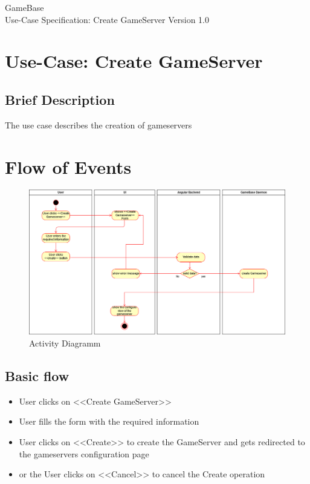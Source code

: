 \documentclass[a4paper,12pt,chapterprefix=false,bibliography=totoc,listof=totoc,book]{scrreprt}
\begin{document}
\begin{flushright}
GameBase
\\
Use-Case Specification: Create GameServer
\bigbreak
Version 1.0
\end{flushright}

\tableofcontents

\chapter{Use-Case: Create GameServer}

\section{Brief Description}
The use case describes the creation of gameservers

\chapter{Flow of Events}
\begin{figure}[H]
	\includegraphics[width=\textwidth]{diagramms/CreateGameserverActivityDiagramm.png}
	\caption{Activity Diagramm}
	\label{fig:ucd}
\end{figure}
\section{Basic flow}

\begin{itemize}
    \item User clicks on <<Create GameServer>>
    \item User fills the form with the required information
    \item User clicks on <<Create>> to create the GameServer and gets redirected to the gameservers configuration page
    \item or the User clicks on <<Cancel>> to cancel the Create operation
\end{itemize}
\end{document}
